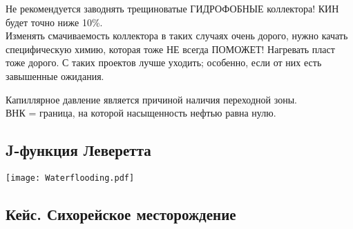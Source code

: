 \documentclass[main.tex]{subfiles}
\begin{document}
Не рекомендуется заводнять трещиноватые ГИДРОФОБНЫЕ коллектора! КИН будет точно ниже 10\%.\\

Изменять смачиваемость коллектора в таких случаях очень дорого, нужно качать специфическую химию, которая тоже НЕ всегда ПОМОЖЕТ! Нагревать пласт тоже дорого. С таких проектов лучше уходить; особенно, если от них есть завышенные ожидания.


Капиллярное давление является причиной наличия переходной зоны.\\

ВНК = граница, на которой насыщенность нефтью равна нулю.\\



\subsection{J-функция Леверетта}

\texttt{[image: Waterflooding.pdf]}











\subsection{Кейс. Сихорейское месторождение}
\end{document}
